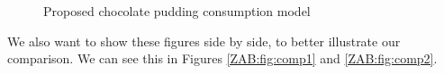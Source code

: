 \documentclass{ccr15}
\begin{document}
\begin{figure}[htb]
\begin{center}
 \caption{Proposed chocolate pudding consumption model}\label{ZAB:fig:cos}
\end{center}\end{figure}

We also want to show these figures side by side, to better illustrate our comparison.  We can see this in Figures
\ref{ZAB:fig:comp1} and \ref{ZAB:fig:comp2}.
\end{document}
